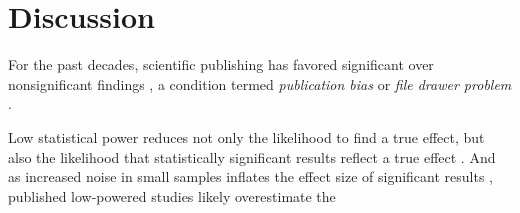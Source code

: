 \section{Discussion}
For the past decades, scientific publishing has favored significant over nonsignificant findings \citep{dwan2008systematic}, a condition termed \textit{publication bias} or \textit{file drawer problem} \citep{rosenthal1979file}.

Low statistical power reduces not only the likelihood to find a true effect, but also the likelihood that statistically significant results reflect a true effect \citep{button2013power}.
And as increased noise in small samples inflates the effect size of significant results \citep{loken2017measurement}, published low-powered studies likely overestimate the